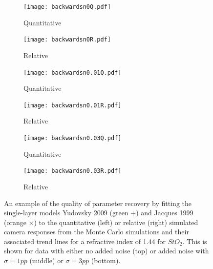 \begin{figure}[h!]
    \centering
    \begin{subfigure}{0.49\textwidth}
        \texttt{[image: backwardsn0Q.pdf]}
        \caption{Quantitative}
        \label{fig:backwardsn0Q}
    \end{subfigure}
    \begin{subfigure}{0.49\textwidth}
        \texttt{[image: backwardsn0R.pdf]}
        \caption{Relative}
        \label{fig:backwardsn0R}
    \end{subfigure}
    \begin{subfigure}{0.49\textwidth}
        \texttt{[image: backwardsn0.01Q.pdf]}
        \caption{Quantitative}
        \label{fig:backwardsn0.01Q}
    \end{subfigure}
    \begin{subfigure}{0.49\textwidth}
        \texttt{[image: backwardsn0.01R.pdf]}
        \caption{Relative}
        \label{fig:backwardsm0.01R}
    \end{subfigure}
    \begin{subfigure}{0.49\textwidth}
        \texttt{[image: backwardsn0.03Q.pdf]}
        \caption{Quantitative}
        \label{fig:backwardsn0.03Q}
    \end{subfigure}
    \begin{subfigure}{0.49\textwidth}
        \texttt{[image: backwardsn0.03R.pdf]}
        \caption{Relative}
        \label{fig:backwardsm0.03R}
    \end{subfigure}
    \caption{An example of the quality of parameter recovery by fitting the single-layer models Yudovsky 2009 (\textcolor{MyGreen}{green $+$}) and Jacques 1999 (\textcolor{MyOrange}{orange $\times$}) to the quantitative (left) or relative (right) simulated camera responses from the Monte Carlo simulations and their associated trend lines for a refractive index of 1.44 for $StO_2$. This is shown for data with either no added noise (top) or added noise with $\sigma = 1pp$ (middle) or $\sigma = 3pp$ (bottom).}
    \label{fig:backwardsHSIMC1}
\end{figure}

